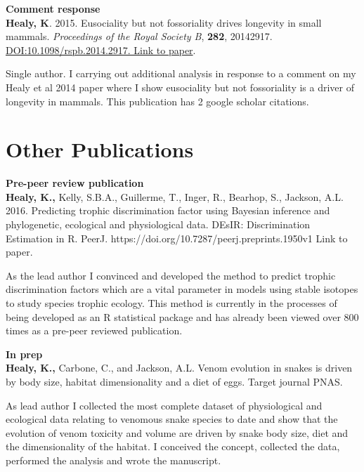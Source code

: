 \documentclass[10pt,a4paper]{article}
\begin{document}
\begin{flushleft}
\textbf{Comment response}\\
\setlength{\parindent}{0mm}\textbf{Healy, K}. 2015.  Eusociality but not fossoriality drives longevity in small mammals. \textit{Proceedings of the Royal Society B}, \textbf{282}, 20142917. \href{http://rspb.royalsocietypublishing.org/content/282/1806/20142917} {DOI:10.1098/rspb.2014.2917. Link to paper}. 
\smallskip
\par{\fontsize{10.5}{10} Single author. I carrying out additional analysis in response to a comment on my Healy et al 2014 paper where I show eusociality but not fossoriality is a driver of longevity in mammals. This publication has 2 google scholar citations.}

\bigskip

\section{Other Publications}
\textbf{Pre-peer review publication}\\
\setlength{\parindent}{0mm}\textbf{Healy, K.,} Kelly, S.B.A., Guillerme, T., Inger, R., Bearhop, S., Jackson, A.L. 2016. Predicting trophic discrimination factor using Bayesian inference and phylogenetic, ecological and physiological data. DEsIR: Discrimination Estimation in R. PeerJ. {https://doi.org/10.7287/peerj.preprints.1950v1 Link to paper}.
\smallskip
\par{\fontsize{10.5}{10} As the lead author I convinced and developed the method to predict trophic discrimination factors which are a vital parameter in models using stable isotopes to study species trophic ecology. This method is currently in the processes of being developed as an R statistical package and has already been viewed over 800 times as a pre-peer reviewed publication.}

\bigskip

\textbf{In prep}\\

\setlength{\parindent}{0mm}\textbf{Healy, K.,} Carbone, C., and Jackson, A.L. Venom evolution in snakes is driven by body size, habitat dimensionality and a diet of eggs. Target journal PNAS.
\smallskip
\par{\fontsize{10.5}{10} As lead author I collected the most complete dataset of physiological and ecological data relating to venomous snake species to date and show that the evolution of venom toxicity and volume are driven by snake body size, diet and the dimensionality of the habitat. I conceived the concept, collected the data, performed the analysis and wrote the manuscript.}



\end{flushleft}
\end{document}
